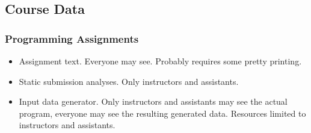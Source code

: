 
\subsection{Course Data}

\subsubsection{Programming Assignments}

\begin{itemize}

\item Assignment text. Everyone may see. Probably requires some pretty
printing.

\item Static submission analyses. Only instructors and assistants.

\item Input data generator. Only instructors and assistants may see the actual
program, everyone may see the resulting generated data. Resources limited to
instructors and assistants.

\end{itemize}


